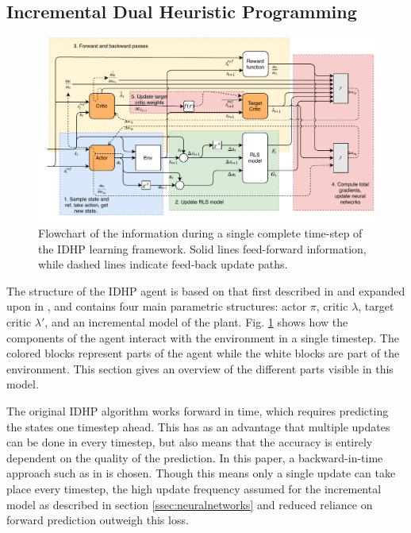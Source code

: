 \subsection{Incremental Dual Heuristic Programming} \label{ssec:idhp}

\begin{figure}[htb]
    \centering
    \includegraphics[width=\textwidth]{fig/2/flowchart.pdf}
    \caption{Flowchart of the information during a single complete time-step of the IDHP learning framework. Solid lines feed-forward information, while dashed lines indicate feed-back update paths. }
    \label{fig:idhp_flowchart}
\end{figure}

The structure of the IDHP agent is based on that first described in \cite{Zhou2018DHP} and expanded upon in \cite{Heyer2020}, and contains four main parametric structures: actor $\pi$, critic $\lambda$, target critic $\lambda'$, and an incremental model of the plant. Fig. \ref{fig:idhp_flowchart} shows how the components of the agent interact with the environment in a single timestep. The colored blocks represent parts of the agent while the white blocks are part of the environment. This section gives an overview of the different parts visible in this model. 

The original IDHP algorithm works forward in time, which requires predicting the states one timestep ahead. This has as an advantage that multiple updates can be done in every timestep, but also means that the accuracy is entirely dependent on the quality of the prediction. In this paper, a backward-in-time approach such as in \cite{Heyer2020, Enns2003a} is chosen. Though this means only a single update can take place every timestep, the high update frequency assumed for the incremental model as described in section \ref{ssec:neuralnetworks} and reduced reliance on forward prediction outweigh this loss.

